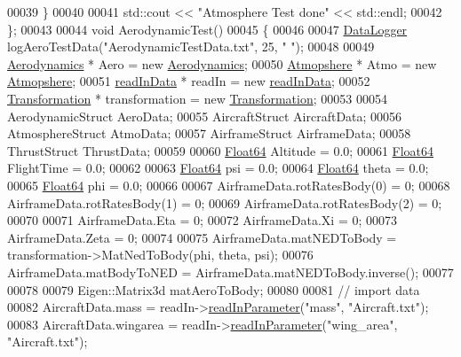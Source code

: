 \begin{DoxyCode}
00039     \}
00040 
00041     std::cout << \textcolor{stringliteral}{"Atmosphere Test done"} << std::endl;
00042 \};
00043 
00044 \textcolor{keywordtype}{void} AerodynamicTest()
00045 \{
00046 
00047     \hyperlink{group___tools_class_data_logger}{DataLogger} logAeroTestData(\textcolor{stringliteral}{"AerodynamicTestData.txt"}, 25, \textcolor{stringliteral}{" "});
00048 
00049     \hyperlink{group___aerodynamic_class_aerodynamics}{Aerodynamics} * Aero = \textcolor{keyword}{new} \hyperlink{group___aerodynamic_class_aerodynamics}{Aerodynamics};
00050     \hyperlink{group___atmosphere_class_atmopshere}{Atmopshere} * Atmo = \textcolor{keyword}{new} \hyperlink{group___atmosphere_class_atmopshere}{Atmopshere};
00051     \hyperlink{classread_in_data}{readInData} * readIn = \textcolor{keyword}{new} \hyperlink{classread_in_data}{readInData};
00052     \hyperlink{class_transformation}{Transformation} * transformation = \textcolor{keyword}{new} \hyperlink{class_transformation}{Transformation};
00053 
00054     AerodynamicStruct  AeroData;
00055     AircraftStruct     AircraftData;
00056     AtmosphereStruct   AtmoData;
00057     AirframeStruct  AirframeData;
00058     ThrustStruct  ThrustData;
00059 
00060     \hyperlink{group___tools_ga3f1431cb9f76da10f59246d1d743dc2c}{Float64} Altitude = 0.0;
00061     \hyperlink{group___tools_ga3f1431cb9f76da10f59246d1d743dc2c}{Float64} FlightTime = 0.0;
00062 
00063     \hyperlink{group___tools_ga3f1431cb9f76da10f59246d1d743dc2c}{Float64} psi = 0.0;
00064     \hyperlink{group___tools_ga3f1431cb9f76da10f59246d1d743dc2c}{Float64} theta = 0.0;
00065     \hyperlink{group___tools_ga3f1431cb9f76da10f59246d1d743dc2c}{Float64} phi = 0.0;
00066 
00067     AirframeData.rotRatesBody(0) = 0;
00068     AirframeData.rotRatesBody(1) = 0;
00069     AirframeData.rotRatesBody(2) = 0;
00070 
00071     AirframeData.Eta = 0;
00072     AirframeData.Xi = 0;
00073     AirframeData.Zeta = 0;
00074 
00075     AirframeData.matNEDToBody = transformation->MatNedToBody(phi, theta, psi);
00076     AirframeData.matBodyToNED = AirframeData.matNEDToBody.inverse();
00077 
00078 
00079     Eigen::Matrix3d matAeroToBody;
00080 
00081     \textcolor{comment}{// import data}
00082     AircraftData.mass       = readIn->\hyperlink{classread_in_data_a9ae979e74958b43424cb6cf4a22043d7}{readInParameter}(\textcolor{stringliteral}{"mass"}, \textcolor{stringliteral}{"Aircraft.txt"});
00083     AircraftData.wingarea   = readIn->\hyperlink{classread_in_data_a9ae979e74958b43424cb6cf4a22043d7}{readInParameter}(\textcolor{stringliteral}{"wing\_area"}, \textcolor{stringliteral}{"Aircraft.txt"});

\end{DoxyCode}
